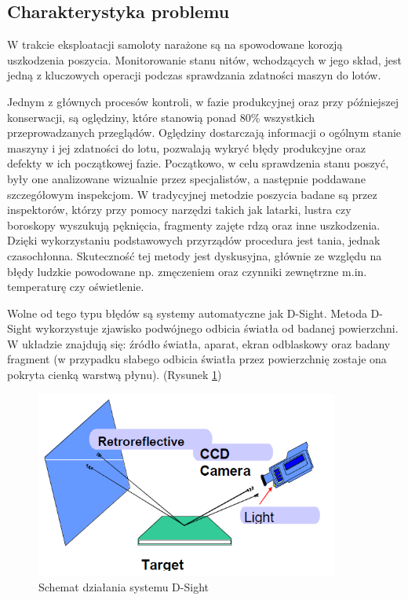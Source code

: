 \documentclass[polish,12pt]{aghthesis}
\begin{document}
\subsection{Charakterystyka problemu}
\par
W trakcie eksploatacji samoloty narażone są na spowodowane korozją uszkodzenia poszycia. Monitorowanie stanu nitów, wchodzących w jego skład, jest jedną z kluczowych operacji podczas sprawdzania zdatności maszyn do lotów. 
\par
Jednym z głównych procesów kontroli, w fazie produkcyjnej oraz przy późniejszej konserwacji, są oględziny, które stanowią ponad 80\% wszystkich przeprowadzanych przeglądów. Oględziny dostarczają informacji o ogólnym stanie maszyny i jej zdatności do lotu, pozwalają wykryć błędy produkcyjne oraz defekty w ich początkowej fazie.
Początkowo, w celu sprawdzenia stanu poszyć, były one analizowane wizualnie przez specjalistów, a następnie poddawane szczegółowym inspekcjom. 
W tradycyjnej metodzie poszycia badane są przez inspektorów, którzy przy pomocy narzędzi takich jak latarki, lustra czy boroskopy wyszukują pęknięcia, fragmenty zajęte rdzą oraz inne uszkodzenia. Dzięki wykorzystaniu podstawowych przyrządów procedura jest tania, jednak czasochłonna. Skuteczność tej metody jest dyskusyjna\cite{repSpencer}, głównie ze względu na błędy ludzkie powodowane np. zmęczeniem\cite{artLock} oraz czynniki zewnętrzne m.in. temperaturę czy oświetlenie.
\par
Wolne od tego typu błędów są systemy automatyczne jak D-Sight. Metoda D-Sight wykorzystuje zjawisko podwójnego odbicia światła od badanej powierzchni. W układzie znajdują się: źródło światła, aparat, ekran odblaskowy oraz badany fragment (w przypadku słabego odbicia światła przez powierzchnię zostaje ona pokryta cienką warstwą płynu). (Rysunek \ref{fig:shemat-dzialania}) 
\begin{figure} [h]
  \centering
  \includegraphics[width=10cm]{images/schemat-dzialania.PNG}
  \caption{Schemat działania systemu D-Sight\cite{artKom}}
  \label{fig:shemat-dzialania}
\end{figure}
\end{document}
